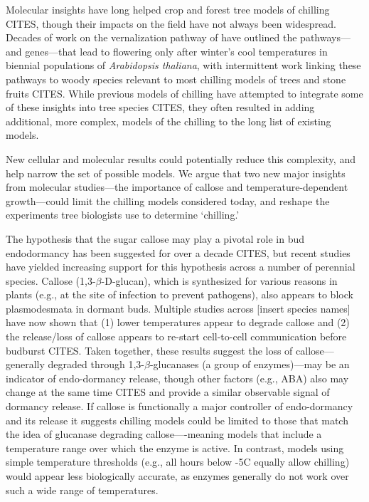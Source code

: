 \documentclass[11pt]{article}
\begin{document}
Molecular insights have long helped crop and forest tree models of chilling CITES, though their impacts on the field have not always been widespread. Decades of work on the vernalization pathway of  have outlined the pathways---and genes---that lead to flowering only after winter's cool temperatures in biennial populations of \emph{Arabidopsis thaliana}, with intermittent work linking these pathways to woody species relevant to most chilling models of trees and stone fruits CITES. While previous models of chilling have attempted to integrate some of these insights into tree species CITES, they often resulted in adding additional, more complex, models of the chilling to the long list of existing models. 

New cellular and molecular results could potentially reduce this complexity, and help narrow the set of possible models.  We argue that two new major insights from molecular studies---the importance of callose and temperature-dependent growth---could limit the chilling models considered today, and reshape the experiments tree biologists use to determine `chilling.' 

The hypothesis that the sugar callose may play a pivotal role in bud endodormancy has been suggested for over a decade CITES, but recent studies have yielded increasing support for this hypothesis across a number of perennial species. Callose (1,3-$\beta$-{\sc D}-glucan), which is synthesized for various reasons in plants (e.g., at the site of infection to prevent pathogens), also appears to block plasmodesmata in dormant buds. Multiple studies across [insert species names] have now shown that (1) lower temperatures appear to degrade callose and (2) the release/loss of callose appears to re-start cell-to-cell communication before budburst CITES. Taken together, these results suggest the loss of callose---generally degraded through 1,3-$\beta$-glucanases (a group of enzymes)---may be an indicator of endo-dormancy release, though other factors (e.g., ABA) also may change at the same time CITES and provide a similar observable signal of dormancy release. If callose is functionally a major controller of endo-dormancy and its release it suggests chilling models could be limited to those that match the idea of glucanase degrading callose----meaning models that include a temperature range over which the enzyme is active. In contrast, models using simple temperature thresholds (e.g., all hours below -5\degree C equally allow chilling) would appear less biologically accurate, as enzymes generally do not work over such a wide range of temperatures. 
\end{document}
